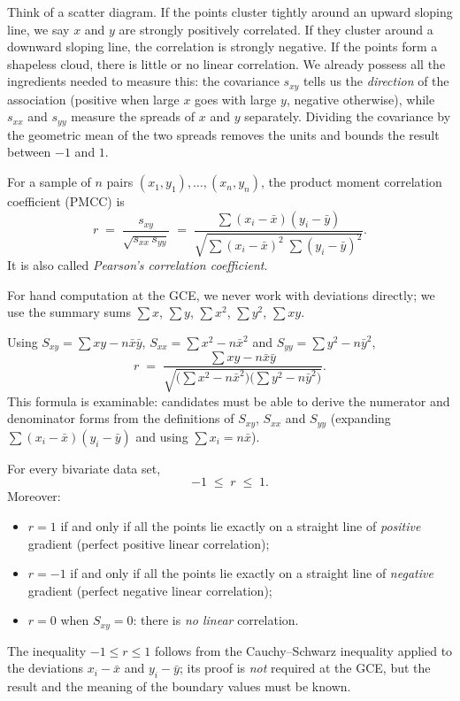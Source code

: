 \documentclass[11pt]{article}
\newcommand{\cle}[1]{{\popxbold\color{popdark}#1}}
\newcounter{popsec}
\newcounter{popsub}
\newcommand{\courssub}[1]{%
  \stepcounter{popsub}%
  \par\vspace{9pt}\noindent{\popxbold\fontsize{11.5}{13}\selectfont\color{popink}{\color{poporange}\thepopsec.\thepopsub}\hspace{6pt}#1}\par\nopagebreak\vspace{4pt}
}
\begin{document}
Think of a scatter diagram. If the points cluster tightly around an upward sloping line, we say $x$ and $y$ are strongly positively correlated. If they cluster around a downward sloping line, the correlation is strongly negative. If the points form a shapeless cloud, there is little or no linear correlation. We already possess all the ingredients needed to measure this: the covariance $s_{xy}$ tells us the \emph{direction} of the association (positive when large $x$ goes with large $y$, negative otherwise), while $s_{xx}$ and $s_{yy}$ measure the spreads of $x$ and $y$ separately. Dividing the covariance by the geometric mean of the two spreads removes the units and bounds the result between $-1$ and $1$.

\begin{definition}
For a sample of $n$ pairs $(x_1,y_1),\dots,(x_n,y_n)$, the \cle{product moment correlation coefficient} (PMCC) is
\[
r \;=\; \frac{s_{xy}}{\sqrt{s_{xx}\,s_{yy}}}
\;=\; \frac{\displaystyle\sum (x_i-\bar{x})(y_i-\bar{y})}{\sqrt{\displaystyle\sum (x_i-\bar{x})^2 \;\sum (y_i-\bar{y})^2}} .
\]
It is also called \emph{Pearson's correlation coefficient}.
\end{definition}

For hand computation at the GCE, we never work with deviations directly; we use the summary sums $\sum x$, $\sum y$, $\sum x^2$, $\sum y^2$, $\sum xy$.

\begin{propriete}
Using $S_{xy}=\sum xy - n\bar{x}\bar{y}$, $S_{xx}=\sum x^2 - n\bar{x}^2$ and $S_{yy}=\sum y^2 - n\bar{y}^2$,
\[
r \;=\; \frac{\sum xy - n\bar{x}\bar{y}}{\sqrt{\bigl(\sum x^2 - n\bar{x}^2\bigr)\bigl(\sum y^2 - n\bar{y}^2\bigr)}} .
\]
This formula is examinable: candidates must be able to derive the numerator and denominator forms from the definitions of $S_{xy}$, $S_{xx}$ and $S_{yy}$ (expanding $\sum(x_i-\bar{x})(y_i-\bar{y})$ and using $\sum x_i = n\bar{x}$).
\end{propriete}

\courssub{Properties and Interpretation of $r$}

\begin{propriete}
For every bivariate data set,
\[
-1 \;\le\; r \;\le\; 1 .
\]
Moreover:
\begin{itemize}
\item $r = 1$ if and only if all the points lie exactly on a straight line of \emph{positive} gradient (perfect positive linear correlation);
\item $r = -1$ if and only if all the points lie exactly on a straight line of \emph{negative} gradient (perfect negative linear correlation);
\item $r = 0$ when $S_{xy}=0$: there is \emph{no linear} correlation.
\end{itemize}
The inequality $-1\le r\le 1$ follows from the Cauchy--Schwarz inequality applied to the deviations $x_i-\bar{x}$ and $y_i-\bar{y}$; its proof is \emph{not} required at the GCE, but the result and the meaning of the boundary values must be known.
\end{propriete}
\end{document}
